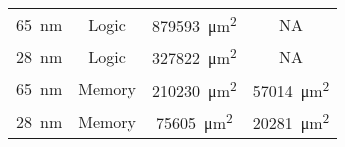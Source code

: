 \begin{table}[h]
\begin{minipage}{1\textwidth}
\begin{minipage}{0.65\textwidth}
\begin{adjustbox}{width=1\textwidth}
\begin{tabular}{ |c|c|c|c|  }
          \SI{65}{\nano\meter}  & Logic     & \SI[per-mode=symbol]{879593}{\square\micro\meter}  & NA\\ %
          \SI{28}{\nano\meter}  & Logic     & \SI[per-mode=symbol]{327822}{\square\micro\meter}  & NA\\ %
          \SI{65}{\nano\meter}  & Memory    & \SI[per-mode=symbol]{210230}{\square\micro\meter}  & \SI[per-mode=symbol]{57014}{\square\micro\meter}    \\
          \SI{28}{\nano\meter}  & Memory    & \SI[per-mode=symbol]{75605 }{\square\micro\meter}  & \SI[per-mode=symbol]{20281}{\square\micro\meter}    \\
              \hline
            \end{tabular}
        \end{adjustbox}
      \label{tab:Example design area}
    \end{minipage}
  \end{minipage}
  \captionsetup{justification=centering, skip=9pt}
  \vspace{0.0cm}
  \label{tab:Scaling runs}
\end{table}

